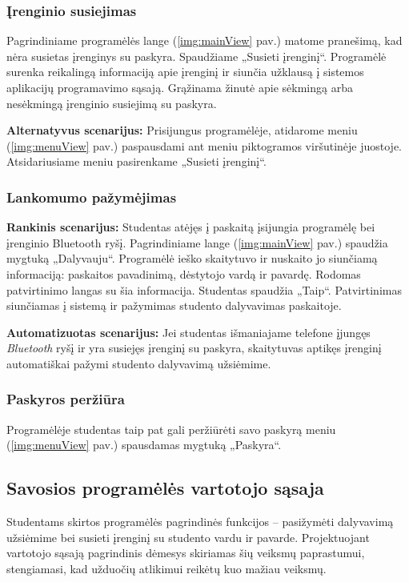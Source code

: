 \documentclass{VUMIFPSbakalaurinis}
\begin{document}
\subsubsection{Įrenginio susiejimas}

Pagrindiniame programėlės lange (\ref{img:mainView} pav.) matome pranešimą, kad nėra susietas įrenginys su paskyra. Spaudžiame „Susieti įrenginį“. Programėlė surenka reikalingą informaciją apie įrenginį ir siunčia užklausą į sistemos aplikacijų programavimo sąsają. Grąžinama žinutė apie sėkmingą arba nesėkmingą įrenginio susiejimą su paskyra.

\textbf{Alternatyvus scenarijus:} Prisijungus programėlėje, atidarome meniu (\ref{img:menuView} pav.) paspausdami ant meniu piktogramos viršutinėje juostoje. Atsidariusiame meniu pasirenkame „Susieti įrenginį“.

\subsubsection{Lankomumo pažymėjimas}

\textbf{Rankinis scenarijus:} Studentas atėjęs į paskaitą įsijungia programėlę bei įrenginio Bluetooth ryšį. Pagrindiniame lange (\ref{img:mainView} pav.) spaudžia mygtuką „Dalyvauju“. Programėlė ieško skaitytuvo ir nuskaito jo siunčiamą informaciją: paskaitos pavadinimą, dėstytojo vardą ir pavardę. Rodomas patvirtinimo langas su šia informacija. Studentas spaudžia „Taip“. Patvirtinimas siunčiamas į sistemą ir pažymimas studento dalyvavimas paskaitoje.

\textbf{Automatizuotas scenarijus:} Jei studentas išmaniajame telefone įjungęs \textit{Bluetooth} ryšį ir yra susiejęs įrenginį su paskyra, skaitytuvas aptikęs įrenginį automatiškai pažymi studento dalyvavimą užsiėmime.

\subsubsection{Paskyros peržiūra}

Programėlėje studentas taip pat gali peržiūrėti savo paskyrą meniu (\ref{img:menuView} pav.) spausdamas mygtuką „Paskyra“.

\subsection{Savosios programėlės vartotojo sąsaja}

Studentams skirtos programėlės pagrindinės funkcijos – pasižymėti dalyvavimą užsiėmime bei susieti įrenginį su studento vardu ir pavarde. Projektuojant vartotojo sąsają pagrindinis dėmesys skiriamas šių veiksmų paprastumui, stengiamasi, kad užduočių atlikimui reikėtų kuo mažiau veiksmų.
\end{document}
